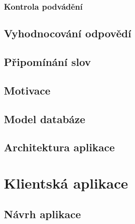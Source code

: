 \documentclass[a4paper,11pt,titlepage,fleqn]{article}
\begin{document}
        \subsubsection{Kontrola podvádění}


    \subsection{Vyhodnocování odpovědí}

    \subsection{Připomínání slov}

    \subsection{Motivace}

    \subsection{Model databáze}


    \subsection{Architektura aplikace}


\newpage
\section{Klientská aplikace}

    \subsection{Návrh aplikace}
\end{document}
